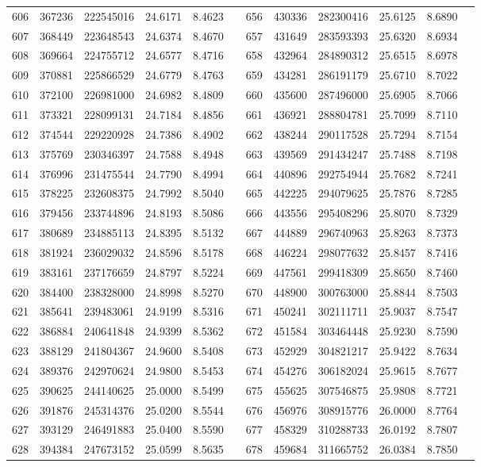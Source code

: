 \begin{longtable}{SSSSSSSSSSSS}
606&367236&222545016&24.6171&8.4623&&656&430336&282300416&25.6125&8.6890\\
607&368449&223648543&24.6374&8.4670&&657&431649&283593393&25.6320&8.6934\\
608&369664&224755712&24.6577&8.4716&&658&432964&284890312&25.6515&8.6978\\
609&370881&225866529&24.6779&8.4763&&659&434281&286191179&25.6710&8.7022\\
610&372100&226981000&24.6982&8.4809&&660&435600&287496000&25.6905&8.7066\\
611&373321&228099131&24.7184&8.4856&&661&436921&288804781&25.7099&8.7110\\
612&374544&229220928&24.7386&8.4902&&662&438244&290117528&25.7294&8.7154\\
613&375769&230346397&24.7588&8.4948&&663&439569&291434247&25.7488&8.7198\\
614&376996&231475544&24.7790&8.4994&&664&440896&292754944&25.7682&8.7241\\
615&378225&232608375&24.7992&8.5040&&665&442225&294079625&25.7876&8.7285\\
616&379456&233744896&24.8193&8.5086&&666&443556&295408296&25.8070&8.7329\\
617&380689&234885113&24.8395&8.5132&&667&444889&296740963&25.8263&8.7373\\
618&381924&236029032&24.8596&8.5178&&668&446224&298077632&25.8457&8.7416\\
619&383161&237176659&24.8797&8.5224&&669&447561&299418309&25.8650&8.7460\\
620&384400&238328000&24.8998&8.5270&&670&448900&300763000&25.8844&8.7503\\
621&385641&239483061&24.9199&8.5316&&671&450241&302111711&25.9037&8.7547\\
622&386884&240641848&24.9399&8.5362&&672&451584&303464448&25.9230&8.7590\\
623&388129&241804367&24.9600&8.5408&&673&452929&304821217&25.9422&8.7634\\
624&389376&242970624&24.9800&8.5453&&674&454276&306182024&25.9615&8.7677\\
625&390625&244140625&25.0000&8.5499&&675&455625&307546875&25.9808&8.7721\\
626&391876&245314376&25.0200&8.5544&&676&456976&308915776&26.0000&8.7764\\
627&393129&246491883&25.0400&8.5590&&677&458329&310288733&26.0192&8.7807\\
628&394384&247673152&25.0599&8.5635&&678&459684&311665752&26.0384&8.7850\\

\end{longtable}
